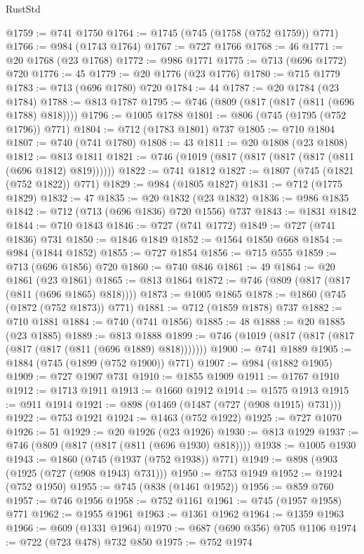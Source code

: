 \begin{lexlean}{RustStd}
\begin{coremodule}
@1759 := @741 @1750
@1764 := @1745 (@745 (@1758 (@752 @1759)) @771)
@1766 := @984 (@1743 @1764)
@1767 := @727 @1766
@1768 := 46
@1771 := @20 @1768 (@23 @1768)
@1772 := @986 @1771
@1775 := @713 (@696 @1772) @720
@1776 := 45
@1779 := @20 @1776 (@23 @1776)
@1780 := @715 @1779
@1783 := @713 (@696 @1780) @720
@1784 := 44
@1787 := @20 @1784 (@23 @1784)
@1788 := @813 @1787
@1795 := @746 (@809 (@817 (@817 (@811 (@696 @1788) @818))))
@1796 := @1005 @1788
@1801 := @806 (@745 (@1795 (@752 @1796)) @771)
@1804 := @712 (@1783 @1801) @737
@1805 := @710 @1804
@1807 := @740 (@741 @1780)
@1808 := 43
@1811 := @20 @1808 (@23 @1808)
@1812 := @813 @1811
@1821 := @746 (@1019 (@817 (@817 (@817 (@817 (@811 (@696 @1812) @819))))))
@1822 := @741 @1812
@1827 := @1807 (@745 (@1821 (@752 @1822)) @771)
@1829 := @984 (@1805 @1827)
@1831 := @712 (@1775 @1829)
@1832 := 47
@1835 := @20 @1832 (@23 @1832)
@1836 := @986 @1835
@1842 := @712 (@713 (@696 @1836) @720 @1556) @737
@1843 := @1831 @1842
@1844 := @710 @1843
@1846 := @727 (@741 @1772)
@1849 := @727 (@741 @1836) @731
@1850 := @1846 @1849
@1852 := @1564 @1850 @668
@1854 := @984 (@1844 @1852)
@1855 := @727 @1854
@1856 := @715 @555
@1859 := @713 (@696 @1856) @720
@1860 := @740 @846
@1861 := 49
@1864 := @20 @1861 (@23 @1861)
@1865 := @813 @1864
@1872 := @746 (@809 (@817 (@817 (@811 (@696 @1865) @818))))
@1873 := @1005 @1865
@1878 := @1860 (@745 (@1872 (@752 @1873)) @771)
@1881 := @712 (@1859 @1878) @737
@1882 := @710 @1881
@1884 := @740 (@741 @1856)
@1885 := 48
@1888 := @20 @1885 (@23 @1885)
@1889 := @813 @1888
@1899 := @746 (@1019 (@817 (@817 (@817 (@817 (@817 (@811 (@696 @1889) @818)))))))
@1900 := @741 @1889
@1905 := @1884 (@745 (@1899 (@752 @1900)) @771)
@1907 := @984 (@1882 @1905)
@1909 := @727 @1907 @731
@1910 := @1855 @1909
@1911 := @1767 @1910
@1912 := @1713 @1911
@1913 := @1660 @1912
@1914 := @1575 @1913
@1915 := @911 @1914
@1921 := @898 (@1469 (@1487 (@727 (@908 @1915) @731)))
@1922 := @753 @1921
@1924 := @1463 (@752 @1922)
@1925 := @727 @1070
@1926 := 51
@1929 := @20 @1926 (@23 @1926)
@1930 := @813 @1929
@1937 := @746 (@809 (@817 (@817 (@811 (@696 @1930) @818))))
@1938 := @1005 @1930
@1943 := @1860 (@745 (@1937 (@752 @1938)) @771)
@1949 := @898 (@903 (@1925 (@727 (@908 @1943) @731)))
@1950 := @753 @1949
@1952 := @1924 (@752 @1950)
@1955 := @745 (@838 (@1461 @1952))
@1956 := @859 @760
@1957 := @746 @1956
@1958 := @752 @1161
@1961 := @745 (@1957 @1958) @771
@1962 := @1955 @1961
@1963 := @1361 @1962
@1964 := @1359 @1963
@1966 := @609 (@1331 @1964)
@1970 := @687 (@690 @356) @705 @1106
@1974 := @722 (@723 @478) @732 @850
@1975 := @752 @1974

\end{coremodule}
\end{lexlean}
